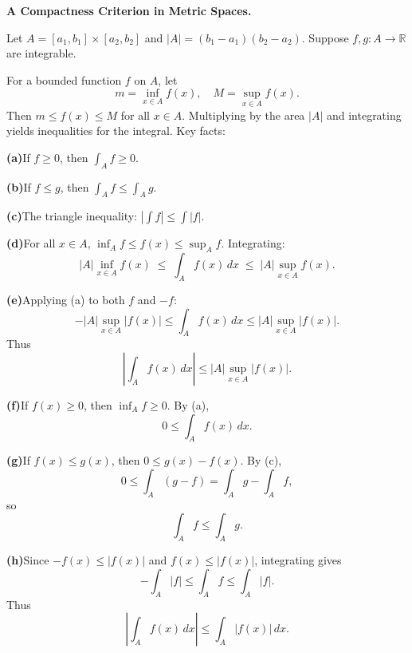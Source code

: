 \begin{problem}[CP-II-0546]
\label{prob:cp-ii-0546}
\textbf{A Compactness Criterion in Metric Spaces.}

\hspace*{1.5em}Let $A=[a_1,b_1]\times[a_2,b_2]$ and $|A|=(b_1-a_1)(b_2-a_2)$.
Suppose $f,g:A\to\mathbb{R}$ are integrable.

For a bounded function $f$ on $A$, let
\[
m=\inf_{x\in A} f(x), \quad M=\sup_{x\in A} f(x).
\]
Then $m\leq f(x)\leq M$ for all $x\in A$. Multiplying by the area $|A|$ and integrating yields inequalities for the integral.
Key facts:

	\par\smallskip\noindent\textbf{(a)}\quad If $f\geq 0$, then $\int_A f\geq 0$.
	\par\smallskip\noindent\textbf{(b)}\quad If $f\leq g$, then $\int_A f\leq \int_A g$.
	\par\smallskip\noindent\textbf{(c)}\quad The triangle inequality: $\left|\int f\right|\leq \int |f|$.

	\par\smallskip\noindent\textbf{(d)}\quad For all $x\in A$, $\inf_A f\leq f(x)\leq \sup_A f$.
	Integrating:
	\[
	|A|\inf_{x\in A} f(x)\;\leq\;\int_A f(x)\,dx\;\leq\;|A|\sup_{x\in A} f(x).
	\]

	\par\smallskip\noindent\textbf{(e)}\quad Applying (a) to both $f$ and $-f$:
	\[
	-|A|\sup_{x\in A}|f(x)|\leq \int_A f(x)\,dx \leq |A|\sup_{x\in A}|f(x)|.
	\]
	Thus
	\[
	\left|\int_A f(x)\,dx\right|\leq |A|\sup_{x\in A}|f(x)|.
	\]

	\par\smallskip\noindent\textbf{(f)}\quad If $f(x)\geq 0$, then $\inf_A f\geq 0$. By (a),
	\[
	0\leq \int_A f(x)\,dx.
	\]

	\par\smallskip\noindent\textbf{(g)}\quad If $f(x)\leq g(x)$, then $0\leq g(x)-f(x)$.
	By (c),
	\[
	0\leq \int_A (g-f)=\int_A g-\int_A f,
	\]
	so
	\[
	\int_A f \leq \int_A g.
	\]

	\par\smallskip\noindent\textbf{(h)}\quad Since $-f(x)\leq |f(x)|$ and $f(x)\leq |f(x)|$, integrating gives
	\[
	-\int_A |f|\leq \int_A f \leq \int_A |f|.
	\]
	Thus
	\[
	\left|\int_A f(x)\,dx\right|\leq \int_A |f(x)|\,dx.
	\]
\end{problem}

